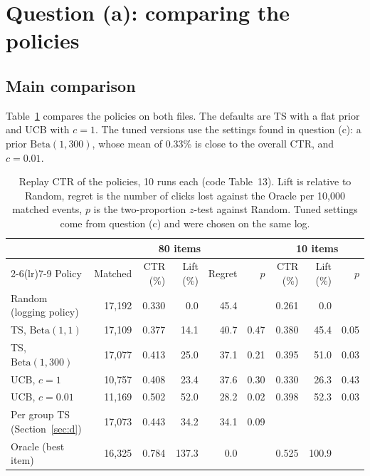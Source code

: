 \documentclass[11pt]{article}
\begin{document}
\section{Question (a): comparing the policies}
\label{sec:a}

\subsection{Main comparison}

Table~\ref{tab:a} compares the policies on both files. The defaults are TS
with a flat prior and UCB with $c=1$. The tuned versions use the settings
found in question (c): a prior $\text{Beta}(1,300)$, whose mean of 0.33\% is
close to the overall CTR, and $c=0.01$.

\begin{table}[H]
  \centering
  \caption{Replay CTR of the policies, 10 runs each (code Table~13). Lift is
    relative to Random, regret is the number of clicks lost against the
    Oracle per 10{,}000 matched events, $p$ is the two-proportion $z$-test
    against Random. Tuned settings come from question (c) and were chosen on
    the same log.}
  \label{tab:a}
  \footnotesize
  \setlength{\tabcolsep}{4pt}
  \begin{tabular}{lrrrrr@{\hspace{14pt}}rrr}
    \toprule
    & \multicolumn{5}{c}{80 items} & \multicolumn{3}{c}{10 items} \\
    \cmidrule(lr){2-6}\cmidrule(lr){7-9}
    Policy & Matched & CTR (\%) & Lift (\%) & Regret & $p$ & CTR (\%) & Lift (\%) & $p$ \\
    \midrule
    Random (logging policy)        & 17{,}192 & 0.330 &   0.0 & 45.4 &       & 0.261 &   0.0 &       \\
    TS, $\text{Beta}(1,1)$         & 17{,}109 & 0.377 &  14.1 & 40.7 & 0.47  & 0.380 &  45.4 & 0.05  \\
    TS, $\text{Beta}(1,300)$       & 17{,}077 & 0.413 &  25.0 & 37.1 & 0.21  & 0.395 &  51.0 & 0.03  \\
    UCB, $c=1$                     & 10{,}757 & 0.408 &  23.4 & 37.6 & 0.30  & 0.330 &  26.3 & 0.43  \\
    UCB, $c=0.01$                  & 11{,}169 & 0.502 &  52.0 & 28.2 & 0.02  & 0.398 &  52.3 & 0.03  \\
    Per group TS (Section~\ref{sec:d}) & 17{,}073 & 0.443 & 34.2 & 34.1 & 0.09  &       &       &       \\
    Oracle (best item)             & 16{,}325 & 0.784 & 137.3 &  0.0 &       & 0.525 & 100.9 &       \\
    \bottomrule
  \end{tabular}
\end{table}
\end{document}
